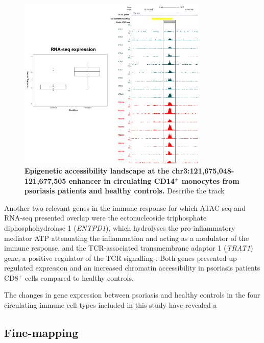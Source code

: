 \begin{figure}[htbp]
\centering
\includegraphics[width=0.8\textwidth]{./Results2/pdfs/ATAC_CD8_peak_TIAM1_RNA_combined}
\caption[Epigenetic landscape at the chr3:121,675,048-121,677,505 enhancer in circulating CD14$^+$ monocytes from psoriasis patients and healthy controls.]{\textbf{Epigenetic accessibility landscape at the chr3:121,675,048-121,677,505 enhancer in circulating CD14$^+$ monocytes from psoriasis patients and healthy controls.} Describe the track }
\label{figure:ATAC_RNAseq_CD8_TIAM1_combined}
\end{figure}



Another two relevant genes in the immune response for which ATAC-seq and RNA-seq presented overlap were the ectonucleoside triphosphate diphosphohydrolase 1 (\textit{ENTPD1}), which hydrolyses the pro-inflammatory mediator ATP attenuating the inflammation and acting as a modulator of the immune response, and the TCR-associated transmembrane adaptor 1 (\textit{TRAT1}) gene, a positive regulator of the TCR signalling \parencite{Antonioli2013, Valk2006}. Both genes presented up-regulated expression and an increased chromatin accessibility in psoriasis patients CD8$^+$ cells compared to healthy controls.

The changes in gene expression between psoriasis and healthy controls in the four circulating immune cell types included in this study have revealed a    

\subsection{Fine-mapping}
